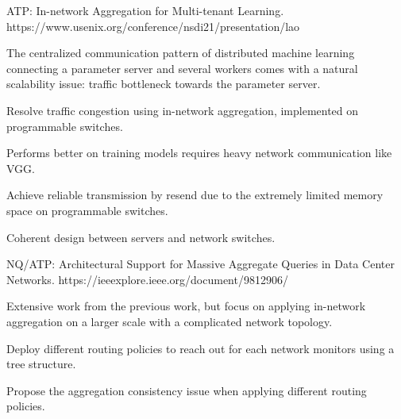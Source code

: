 \begin{cventries}
  \cventry
    {} %
    {ATP: In-network Aggregation for Multi-tenant Learning.} %
    {} %
    {https://www.usenix.org/conference\linebreak/nsdi21/presentation/lao} %
    {
      \vspace{-2mm}
      \begin{cvitems} %
        \item {The centralized communication pattern of distributed machine learning connecting a parameter server and several workers
        comes with a natural scalability issue: traffic bottleneck towards the parameter server.}
        \item {Resolve traffic congestion using in-network aggregation, implemented on programmable switches.}
        \item {Performs better on training models requires heavy network communication like VGG.}
        \item {Achieve reliable transmission by resend due to the extremely limited memory space on programmable switches.}
        \item {Coherent design between servers and network switches.}
      \end{cvitems}
    }

    \vspace{-3mm}
  
    \cventry
      {} %
      {NQ/ATP: Architectural Support for Massive Aggregate Queries in Data Center Networks.} %
      {} %
      {https://ieeexplore.ieee.org\linebreak/document/9812906/} %
      {
        \vspace{-2mm}
        \begin{cvitems} %
          \item {Extensive work from the previous work, but focus on applying in-network aggregation on a larger scale with a complicated
          network topology.}
          \item {Deploy different routing policies to reach out for each network monitors using a tree structure.}
          \item {Propose the aggregation consistency issue when applying different routing policies.}
        \end{cvitems}
      }

      \vspace{-3mm}
  

\end{cventries}
